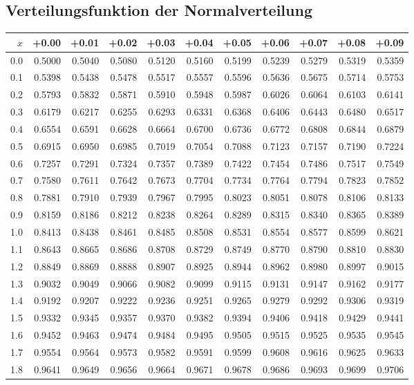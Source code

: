 	\subsection{Verteilungsfunktion der Normalverteilung}
	\begin{minipage}{18cm}
    	\centering
        \scriptsize
\begin{tabular}{|r|rrrrrrrrrr|}
\hline
$x$&+0.00&+0.01&+0.02&+0.03&+0.04&+0.05&+0.06&+0.07&+0.08&+0.09\\
\hline
0.0&0.5000&0.5040&0.5080&0.5120&0.5160&0.5199&0.5239&0.5279&0.5319&0.5359\\
0.1&0.5398&0.5438&0.5478&0.5517&0.5557&0.5596&0.5636&0.5675&0.5714&0.5753\\
0.2&0.5793&0.5832&0.5871&0.5910&0.5948&0.5987&0.6026&0.6064&0.6103&0.6141\\
0.3&0.6179&0.6217&0.6255&0.6293&0.6331&0.6368&0.6406&0.6443&0.6480&0.6517\\
0.4&0.6554&0.6591&0.6628&0.6664&0.6700&0.6736&0.6772&0.6808&0.6844&0.6879\\
0.5&0.6915&0.6950&0.6985&0.7019&0.7054&0.7088&0.7123&0.7157&0.7190&0.7224\\
0.6&0.7257&0.7291&0.7324&0.7357&0.7389&0.7422&0.7454&0.7486&0.7517&0.7549\\
0.7&0.7580&0.7611&0.7642&0.7673&0.7704&0.7734&0.7764&0.7794&0.7823&0.7852\\
0.8&0.7881&0.7910&0.7939&0.7967&0.7995&0.8023&0.8051&0.8078&0.8106&0.8133\\
0.9&0.8159&0.8186&0.8212&0.8238&0.8264&0.8289&0.8315&0.8340&0.8365&0.8389\\
1.0&0.8413&0.8438&0.8461&0.8485&0.8508&0.8531&0.8554&0.8577&0.8599&0.8621\\
1.1&0.8643&0.8665&0.8686&0.8708&0.8729&0.8749&0.8770&0.8790&0.8810&0.8830\\
1.2&0.8849&0.8869&0.8888&0.8907&0.8925&0.8944&0.8962&0.8980&0.8997&0.9015\\
1.3&0.9032&0.9049&0.9066&0.9082&0.9099&0.9115&0.9131&0.9147&0.9162&0.9177\\
1.4&0.9192&0.9207&0.9222&0.9236&0.9251&0.9265&0.9279&0.9292&0.9306&0.9319\\
1.5&0.9332&0.9345&0.9357&0.9370&0.9382&0.9394&0.9406&0.9418&0.9429&0.9441\\
1.6&0.9452&0.9463&0.9474&0.9484&0.9495&0.9505&0.9515&0.9525&0.9535&0.9545\\
1.7&0.9554&0.9564&0.9573&0.9582&0.9591&0.9599&0.9608&0.9616&0.9625&0.9633\\
1.8&0.9641&0.9649&0.9656&0.9664&0.9671&0.9678&0.9686&0.9693&0.9699&0.9706\\

\end{tabular}
\end{minipage}
